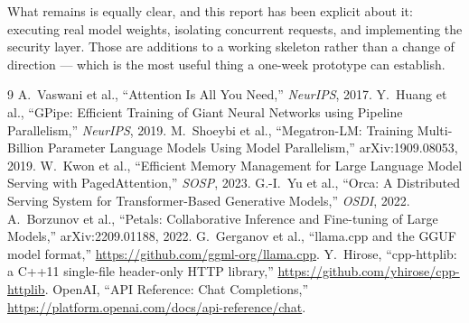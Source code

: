 \documentclass[11pt,a4paper]{article}
\begin{document}
What remains is equally clear, and this report has been explicit about it:
executing real model weights, isolating concurrent requests, and implementing the
security layer. Those are additions to a working skeleton rather than a change of
direction --- which is the most useful thing a one-week prototype can establish.

\begin{thebibliography}{9}
\footnotesize
{} A.~Vaswani et al., ``Attention Is All You Need,''
  \emph{NeurIPS}, 2017.
 Y.~Huang et al., ``GPipe: Efficient Training of Giant Neural
  Networks using Pipeline Parallelism,'' \emph{NeurIPS}, 2019.
 M.~Shoeybi et al., ``Megatron-LM: Training Multi-Billion
  Parameter Language Models Using Model Parallelism,'' arXiv:1909.08053, 2019.
 W.~Kwon et al., ``Efficient Memory Management for Large Language
  Model Serving with PagedAttention,'' \emph{SOSP}, 2023.
 G.-I.~Yu et al., ``Orca: A Distributed Serving System for
  Transformer-Based Generative Models,'' \emph{OSDI}, 2022.
 A.~Borzunov et al., ``Petals: Collaborative Inference and
  Fine-tuning of Large Models,'' arXiv:2209.01188, 2022.
 G.~Gerganov et al., ``llama.cpp and the GGUF model format,''
  \url{https://github.com/ggml-org/llama.cpp}.
 Y.~Hirose, ``cpp-httplib: a C++11 single-file header-only HTTP
  library,'' \url{https://github.com/yhirose/cpp-httplib}.
 OpenAI, ``API Reference: Chat Completions,''
  \url{https://platform.openai.com/docs/api-reference/chat}.
\end{thebibliography}
\end{document}
